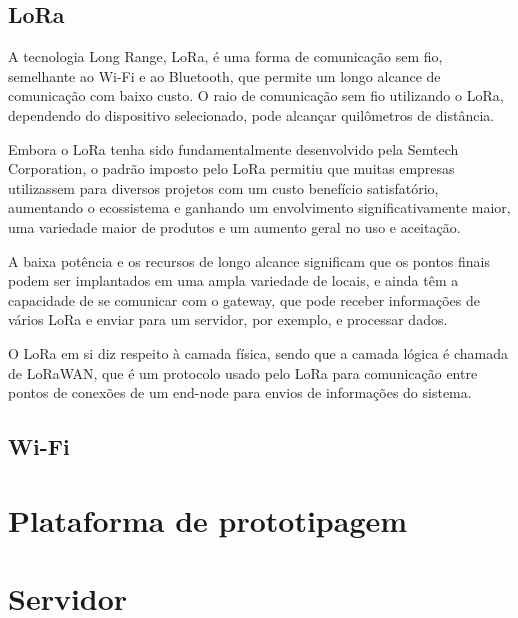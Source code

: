 \subsection{LoRa}
\label{fund:lora}
A tecnologia Long Range, LoRa, é uma forma de comunicação sem fio, semelhante ao Wi-Fi e ao Bluetooth, que permite um longo alcance de comunicação com baixo custo. O raio de comunicação sem fio utilizando o LoRa, dependendo do dispositivo selecionado, pode alcançar quilômetros de distância.

Embora o LoRa tenha sido fundamentalmente desenvolvido pela Semtech Corporation, o padrão imposto pelo LoRa permitiu que muitas empresas utilizassem para diversos projetos com um custo benefício satisfatório, aumentando o ecossistema e ganhando um envolvimento significativamente maior, uma variedade maior de produtos e um aumento geral no uso e aceitação. 


A baixa potência e os recursos de longo alcance significam que os pontos finais podem ser implantados em uma ampla variedade de locais, e ainda têm a capacidade de se comunicar com o gateway, que pode receber informações de vários LoRa e enviar para um servidor, por exemplo, e processar dados.

O LoRa em si diz respeito à camada física, sendo que a camada lógica é chamada de LoRaWAN, que é um protocolo usado pelo LoRa para comunicação entre pontos de conexões de um end-node para envios de informações do sistema.



\subsection{Wi-Fi}
\label{fund:wifi}

\section{Plataforma de prototipagem}
\label{fund:plataforma-proto}

\section{Servidor}
\label{fund:servidor}

